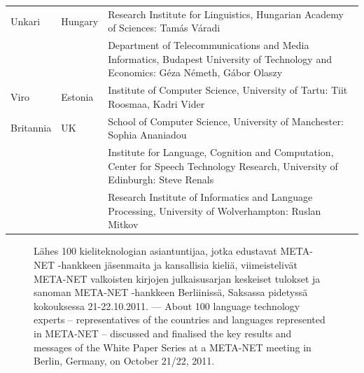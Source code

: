 \begin{longtable}{@{}llp{113mm}@{}}
Unkari & \textcolor{grey1}{Hungary} & Research Institute for Linguistics, Hungarian Academy of Sciences: Tamás Váradi\\  \addlinespace
  & & Department of Telecommunications and Media Informatics, Budapest University of Technology and Economics: Géza Németh, Gábor Olaszy\\ \addlinespace
Viro & \textcolor{grey1}{Estonia} & Institute of Computer Science, University of Tartu: Tiit Roosmaa, Kadri Vider\\ \addlinespace
Britannia & \textcolor{grey1}{UK} & 
  School of Computer Science, University of Manchester: Sophia Ananiadou \\ \addlinespace 
  & & Institute for Language, Cognition and Computation, Center for Speech Technology Research, University of Edinburgh: Steve Renals \\ \addlinespace 
  & & Research Institute of Informatics and Language Processing, University of Wolverhampton: Ruslan Mitkov
\end{longtable}
\normalsize


\renewcommand*{\figureformat}{}
\renewcommand*{\captionformat}{}

\begin{figure}[htbp]
  \center
  \caption{Lähes 100 kieliteknologian asiantuntijaa, jotka edustavat META-NET -hankkeen
jäsenmaita ja kansallisia kieliä,  viimeistelivät META-NET valkoisten kirjojen
julkaisusarjan keskeiset tulokset ja sanoman META-NET -hankkeen Berliinissä,
Saksassa pidetyssä kokouksessa 21-22.10.2011. --- \textcolor{grey1}{About 100 language technology experts -- representatives of the countries and languages represented in META-NET -- discussed and finalised the key results and messages of the White Paper Series at a META-NET meeting in Berlin, Germany, on October 21/22, 2011.}}
  \medskip
\end{figure}

\cleardoublepage

\label{whitepaperseries}

